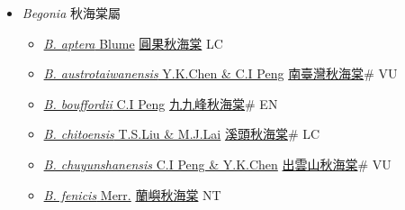 
  \begin{itemize}
 \item[] \textit{Begonia} 秋海棠屬
                    
  \begin{itemize}
        \item[] \href{http://www.theplantlist.org/tpl1.1/search?q=Begonia+aptera}{\textit{B. aptera} Blume}   \href{\detokenize{http://taibnet.sinica.edu.tw/chi/taibnet_species_list.php?T2=圓果秋海棠&T2_new_value=true&fr=y}}{圓果秋海棠} LC
        \item[] \href{http://www.theplantlist.org/tpl1.1/search?q=Begonia+austrotaiwanensis}{\textit{B. austrotaiwanensis} Y.K.Chen \& C.I Peng}   \href{\detokenize{http://taibnet.sinica.edu.tw/chi/taibnet_species_list.php?T2=南臺灣秋海棠&T2_new_value=true&fr=y}}{南臺灣秋海棠}\# VU
        \item[] \href{http://www.theplantlist.org/tpl1.1/search?q=Begonia+bouffordii}{\textit{B. bouffordii} C.I Peng}   \href{\detokenize{http://taibnet.sinica.edu.tw/chi/taibnet_species_list.php?T2=九九峰秋海棠&T2_new_value=true&fr=y}}{九九峰秋海棠}\# EN
        \item[] \href{http://www.theplantlist.org/tpl1.1/search?q=Begonia+chitoensis}{\textit{B. chitoensis} T.S.Liu \& M.J.Lai}   \href{\detokenize{http://taibnet.sinica.edu.tw/chi/taibnet_species_list.php?T2=溪頭秋海棠&T2_new_value=true&fr=y}}{溪頭秋海棠}\# LC
        \item[] \href{http://www.theplantlist.org/tpl1.1/search?q=Begonia+chuyunshanensis}{\textit{B. chuyunshanensis} C.I Peng \& Y.K.Chen}   \href{\detokenize{http://taibnet.sinica.edu.tw/chi/taibnet_species_list.php?T2=出雲山秋海棠&T2_new_value=true&fr=y}}{出雲山秋海棠}\# VU
        \item[] \href{http://www.theplantlist.org/tpl1.1/search?q=Begonia+fenicis}{\textit{B. fenicis} Merr.}   \href{\detokenize{http://taibnet.sinica.edu.tw/chi/taibnet_species_list.php?T2=蘭嶼秋海棠&T2_new_value=true&fr=y}}{蘭嶼秋海棠} NT

\end{itemize}
\end{itemize}
